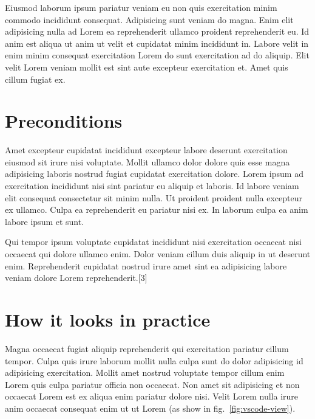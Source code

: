\documentclass[sigconf,]{acmart}
\begin{document}
Eiusmod laborum ipsum pariatur veniam eu non quis exercitation minim
commodo incididunt consequat. Adipisicing sunt veniam do magna. Enim
elit adipisicing nulla ad Lorem ea reprehenderit ullamco proident
reprehenderit eu. Id anim est aliqua ut anim ut velit et cupidatat minim
incididunt in. Labore velit in enim minim consequat exercitation Lorem
do sunt exercitation ad do aliquip. Elit velit Lorem veniam mollit est
sint aute excepteur exercitation et. Amet quis cillum fugiat ex.

\hypertarget{preconditions}{%
\section{Preconditions}\label{preconditions}}

Amet excepteur cupidatat incididunt excepteur labore deserunt
exercitation eiusmod sit irure nisi voluptate. Mollit ullamco dolor
dolore quis esse magna adipisicing laboris nostrud fugiat cupidatat
exercitation dolore. Lorem ipsum ad exercitation incididunt nisi sint
pariatur eu aliquip et laboris. Id labore veniam elit consequat
consectetur sit minim nulla. Ut proident proident nulla excepteur ex
ullamco. Culpa ea reprehenderit eu pariatur nisi ex. In laborum culpa ea
anim labore ipsum et sunt.

Qui tempor ipsum voluptate cupidatat incididunt nisi exercitation
occaecat nisi occaecat qui dolore ullamco enim. Dolor veniam cillum duis
aliquip in ut deserunt enim. Reprehenderit cupidatat nostrud irure amet
sint ea adipisicing labore veniam dolore Lorem reprehenderit.{[}3{]}

\hypertarget{how-it-looks-in-practice}{%
\section{How it looks in practice}\label{how-it-looks-in-practice}}

Magna occaecat fugiat aliquip reprehenderit qui exercitation pariatur
cillum tempor. Culpa quis irure laborum mollit nulla culpa sunt do dolor
adipisicing id adipisicing exercitation. Mollit amet nostrud voluptate
tempor cillum enim Lorem quis culpa pariatur officia non occaecat. Non
amet sit adipisicing et non occaecat Lorem est ex aliqua enim pariatur
dolore nisi. Velit Lorem nulla irure anim occaecat consequat enim ut ut
Lorem (as show in fig.~\ref{fig:vscode-view}).
\end{document}
